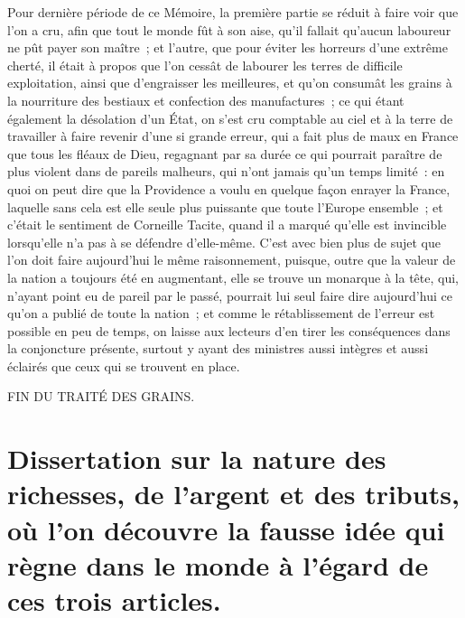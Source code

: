 \documentclass[french,twoside]{book} %
\newcommand\chapteropen{} %
\newcommand\chapterclose{} %
\begin{document}
Pour dernière période de ce Mémoire, la première partie se réduit à faire voir que l’on a cru, afin que tout le monde fût à son aise, qu’il fallait qu’aucun laboureur ne pût payer son maître ; et l’autre, que pour éviter les horreurs d’une extrême cherté, il était à propos que l’on cessât de labourer les terres de difficile exploitation, ainsi que d’engraisser les meilleures, et qu’on consumât les grains à la nourriture des bestiaux et confection des manufactures ; ce qui étant également la désolation d’un État, on s’est cru comptable au ciel et à la terre de travailler à faire revenir d’une si grande erreur, qui a fait plus de maux en France que tous les fléaux de Dieu, regagnant par sa durée ce qui pourrait paraître de plus violent dans de pareils malheurs, qui n’ont jamais qu’un temps limité : en quoi on peut dire que la Providence a voulu en quelque façon enrayer la France, laquelle sans cela est elle seule plus puissante que toute l’Europe ensemble ; et c’était le sentiment de Corneille Tacite, quand il a marqué qu’elle est invincible lorsqu’elle n’a pas à se défendre d’elle-même. C’est avec bien plus de sujet que l’on doit faire aujourd’hui le même raisonnement, puisque, outre que la valeur de la nation a toujours été en augmentant, elle se trouve un monarque à la tête, qui, n’ayant point eu de pareil par le passé, pourrait lui seul faire dire aujourd’hui ce qu’on a publié de toute la nation ; et comme le rétablissement de l’erreur est possible en peu de temps, on laisse aux lecteurs d’en tirer les conséquences dans la conjoncture présente, surtout y ayant des ministres aussi intègres et aussi éclairés que ceux qui se trouvent en place.\par


\begin{raggedleft}FIN DU TRAITÉ DES GRAINS.\end{raggedleft}
\chapterclose


\chapteropen
\chapter[{Dissertation sur la nature des richesses, de l’argent et des tributs, où l’on découvre la fausse idée qui règne dans le monde à l’égard de ces trois articles.}]{Dissertation sur la nature des richesses, de l’argent et des tributs, où l’on découvre la fausse idée qui règne dans le monde à l’égard de ces trois articles.}\renewcommand{\leftmark}{Dissertation sur la nature des richesses, de l’argent et des tributs, où l’on découvre la fausse idée qui règne dans le monde à l’égard de ces trois articles.}
\end{document}
